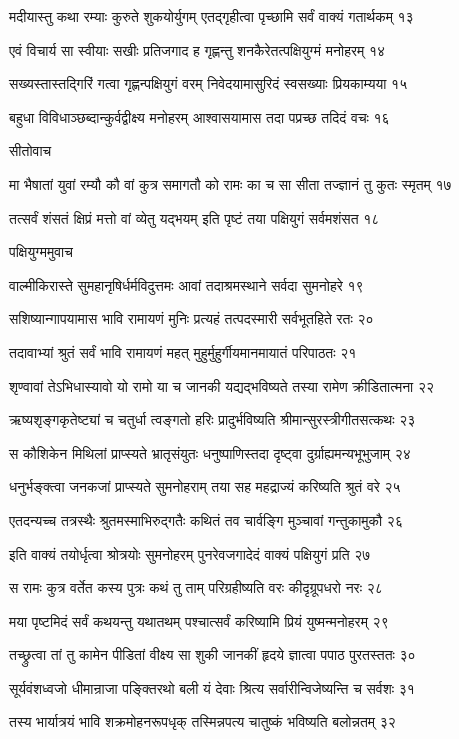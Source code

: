 मदीयास्तु कथा रम्याः कुरुते शुकयोर्युगम्
एतद्गृहीत्वा पृच्छामि सर्वं वाक्यं गतार्थकम् १३

एवं विचार्य सा स्वीयाः सखीः प्रतिजगाद ह
गृह्णन्तु शनकैरेतत्पक्षियुग्मं मनोहरम् १४

सख्यस्तास्तद्गिरिं गत्वा गृह्णन्पक्षियुगं वरम्
निवेदयामासुरिदं स्वसख्याः प्रियकाम्यया १५

बहुधा विविधाञ्छब्दान्कुर्वद्वीक्ष्य मनोहरम्
आश्वासयामास तदा पप्रच्छ तदिदं वचः १६

सीतोवाच

मा भैषातां युवां रम्यौ कौ वां कुत्र समागतौ
को रामः का च सा सीता तज्ज्ञानं तु कुतः स्मृतम् १७

तत्सर्वं शंसतं क्षिप्रं मत्तो वां व्येतु यद्भयम्
इति पृष्टं तया पक्षियुगं सर्वमशंसत १८

पक्षियुग्ममुवाच

वाल्मीकिरास्ते सुमहानृषिर्धर्मविदुत्तमः
आवां तदाश्रमस्थाने सर्वदा सुमनोहरे १९

सशिष्यान्गापयामास भावि रामायणं मुनिः
प्रत्यहं तत्पदस्मारी सर्वभूतहिते रतः २०

तदावाभ्यां श्रुतं सर्वं भावि रामायणं महत्
मुहुर्मुहुर्गीयमानमायातं परिपाठतः २१

शृण्वावां तेऽभिधास्यावो यो रामो या च जानकी
यद्यद्भविष्यते तस्या रामेण क्रीडितात्मना २२

ऋष्यशृङ्गकृतेष्ट्यां च चतुर्धा त्वङ्गतो हरिः
प्रादुर्भविष्यति श्रीमान्सुरस्त्रीगीतसत्कथः २३

स कौशिकेन मिथिलां प्राप्स्यते भ्रातृसंयुतः
धनुष्पाणिस्तदा दृष्ट्वा दुर्ग्राह्यमन्यभूभुजाम् २४

धनुर्भङ्क्त्वा जनकजां प्राप्स्यते सुमनोहराम्
तया सह महद्राज्यं करिष्यति श्रुतं वरे २५

एतदन्यच्च तत्रस्थैः श्रुतमस्माभिरुद्गतैः
कथितं तव चार्वङ्गि मुञ्चावां गन्तुकामुकौ २६

इति वाक्यं तयोर्धृत्वा श्रोत्रयोः सुमनोहरम्
पुनरेवजगादेदं वाक्यं पक्षियुगं प्रति २७

स रामः कुत्र वर्तेत कस्य पुत्रः कथं तु ताम्
परिग्रहीष्यति वरः कीदृग्रूपधरो नरः २८

मया पृष्टमिदं सर्वं कथयन्तु यथातथम्
पश्चात्सर्वं करिष्यामि प्रियं युष्मन्मनोहरम् २९

तच्छ्रुत्वा तां तु कामेन पीडितां वीक्ष्य सा शुकी
जानकीं हृदये ज्ञात्वा पपाठ पुरतस्ततः ३०

सूर्यवंशध्वजो धीमान्राजा पङ्क्तिरथो बली
यं देवाः श्रित्य सर्वारीन्विजेष्यन्ति च सर्वशः ३१

तस्य भार्यात्रयं भावि शक्रमोहनरूपधृक्
तस्मिन्नपत्य चातुष्कं भविष्यति बलोन्नतम् ३२

